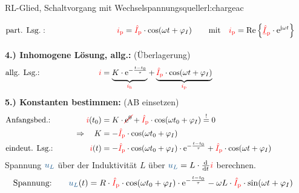 {\begin{bsp}{RL-Glied, Schaltvorgang mit Wechselspannungsquelle}{rl:chargeac}
\begin{align*}
                &\text{part. Lsg.}:&&&
                    \eci{i_{\mathrm p}} &= \eci{\hat{I}_{\mathrm p}} \cdot \cos(\omega t + \varphi_I) &&&
                    &\text{mit}\quad \eci{i_{\mathrm p}} = \Re\left\{\eci{\underline{\hat{I}}_{\mathrm p}} \cdot \mathrm{e}^{\mathrm{j}\omega t}\right\} \vphantom{\Bigg|}
            \\[-15pt]&\hphantom{R1oooooooooo}&&&\hphantom{L3ooooooooooo}&\hphantom{R3ooooooooooooooo}&&&&\hphantom{R5ooooooooooooooooooooooo}\nonumber%
        \end{align*}%
        \textbf{4.) Inhomogene Lösung, allg.:} (Überlagerung)%
        \begin{align*}
                &\text{allg. Lsg.:}&&&
                    \eci{i} &=
                    \underbrace{ \vphantom{\big|}
                        K \cdot \mathrm{e}^{-\frac{t-t_0}{\tau}}
                    }_{\eci{i_{\mathrm h}}}
                    +
                    \underbrace{ \vphantom{\big|}
                        \eci{\hat{I}_{\mathrm p}} \cdot \cos(\omega t + \varphi_I)
                    }_{\eci{i_{\mathrm p}}}&&&
            \\[-15pt]&\hphantom{R1oooooooooo}&&&\hphantom{L3oooooo}&\hphantom{R3ooooooooooooooooooooooooooooooooooooooooooo}&&&&\hphantom{R5}\nonumber%
        \end{align*}
        \textbf{5.) Konstanten bestimmen:} (AB einsetzen)%
        \begin{align*}
            &\text{Anfangsbed.:}&&&
                \eci{i}(t_0) &= K \cdot \redcancel{\mathrm{e}^0} + \eci{\hat{I}_{\mathrm p}} \cdot \cos(\omega t_0 + \varphi_I) \overset{!}{=} 0 \\
            &&&&
                \Rightarrow\quad K &= -\eci{\hat{I}_{\mathrm p}} \cdot \cos(\omega t_0 + \varphi_I) \\
            &\text{eindeut. Lsg.:}&&&
                \eci{i}(t) &= -\eci{\hat{I}_{\mathrm p}} \cdot \cos(\omega t_0 + \varphi_I) \cdot \mathrm{e}^{-\frac{t-t_0}{\tau}} + \eci{\hat{I}_{\mathrm p}} \cdot \cos(\omega t + \varphi_I)
            \\[-15pt]&\hphantom{R1oooooooooo}&&&\hphantom{L3oooooo}&\hphantom{R3ooooooooooooooooooooooooooooooooooooooooooo}&&&&\hphantom{R5}\nonumber%
        \end{align*}
        Spannung $\ecv{u_L}$ über der Induktivität $L$ über $\ecv{u_L} = L \cdot \dt \eci{i}$ berechnen.
        \begin{align*}
            &\text{Spannung:}&&&
                \ecv{u_L}(t) &= R \cdot \eci{\hat{I}_{\mathrm p}} \cdot \cos(\omega t_0 + \varphi_I) \cdot \mathrm{e}^{-\frac{t-t_0}{\tau}} - \omega L \cdot \eci{\hat{I}_{\mathrm p}} \cdot \sin(\omega t + \varphi_I)
        \end{align*}
    \end{bsp}
}%

